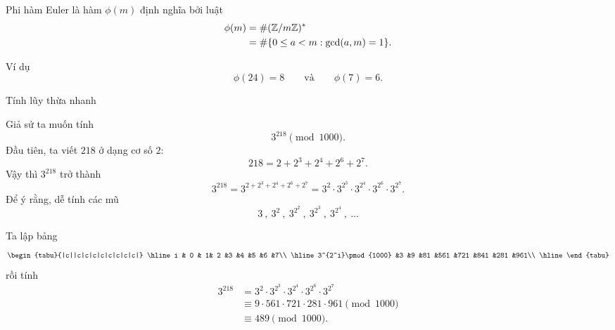 \begin{frame}
  \begin{dfntn}
    Phi hàm Euler là hàm $\phi(m)$ định nghĩa bởi luật 
    \begin{align*}
    \phi(m) &= \#(\mathbb{Z}/m\mathbb{Z})^*\\ 
            &= \#\{0\leq a <m : \gcd (a,m)=1\}.
    \end{align*}
  \end{dfntn}
Ví dụ $$\phi(24) = 8\qquad  \text{và}\qquad \phi(7) = 6.$$
\end{frame}

\begin{frame}{Tính lũy thừa nhanh}
  \begin{xmpl}
    Giả sử ta muốn tính 
    $$
    3^{218} \pmod{1000}.
    $$
    Đầu tiên, ta viết $218$ ở dạng cơ số $2$:
    $$
    218 = 2 + 2^3 + 2^4 + 2^6 + 2^7.
    $$
    Vậy thì $3^{218}$ trở thành 
    $$
    3^{218} = 3^{2 + 2^3 + 2^4 + 2^6 + 2^7}=3^2\cdot 3^{2^3} \cdot  3^{2^4} \cdot 3^{2^6} \cdot 3^{2^7}. 
    $$
Để ý rằng, dễ tính các mũ 
$$
3\ ,\ 3^2\ ,\ 3^{2^2}\ , \  3^{2^3}\ , \ 3^{2^4}\ ,\ \dots  
$$
  \end{xmpl}
\end{frame}

\begin{frame}
  \begin{xmpl}[tiếp]
   Ta lập bảng 
   $$\begin{tabu}{|c||c|c|c|c|c|c|c|c|} 
     \hline 
     i & 0 & 1& 2 &3 &4 &5 &6 &7\\
     \hline 
     3^{2^i}\pmod{1000}  &3  &9 &81 &561 &721 &841 &281 &961\\
\hline 
   \end{tabu}$$
rồi tính 
   \begin{align*}
     3^{218} &= 3^2\cdot 3^{2^3} \cdot  3^{2^4} \cdot 3^{2^6} \cdot 3^{2^7}\\
            &\equiv  9 \cdot 561 \cdot 721 \cdot 281 \cdot 961 \pmod{1000}\\
            &\equiv 489 \pmod{1000}.
   \end{align*}
  \end{xmpl}
\end{frame}

